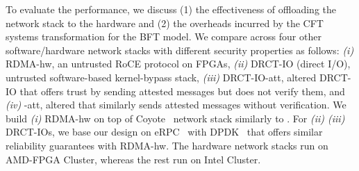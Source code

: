 To evaluate the \projecttitle{} performance, we discuss (1) the effectiveness of offloading the network stack to the \projecttitle{} hardware and (2) the overheads incurred by the CFT systems transformation for the BFT model. We compare \projecttitle{} across four other software/hardware network stacks with different security properties as follows: 
% 
{\em (i)} RDMA-hw, an untrusted RoCE protocol on FPGAs, {\em (ii)} DRCT-IO (direct I/O), untrusted software-based kernel-bypass stack, {\em (iii)} DRCT-IO-att, altered DRCT-IO that offers trust by sending attested messages but does not verify them, and {\em (iv)} \projecttitle{}-att, altered \projecttitle{} that similarly sends attested messages without verification. We build {\em (i)} RDMA-hw on top of Coyote~\cite{coyote} network stack similarly to \projecttitle{}. For {\em (ii) (iii)} DRCT-IOs, we base our design on eRPC~\cite{erpc} with DPDK~\cite{dpdk} that offers similar reliability guarantees with RDMA-hw. The hardware network stacks run on AMD-FPGA Cluster, whereas the rest run on Intel Cluster.

